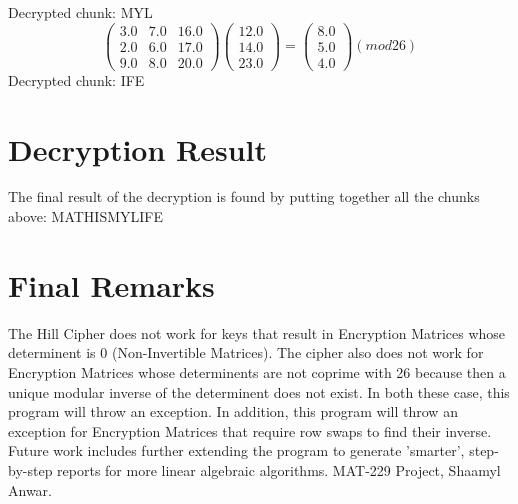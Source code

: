 \documentclass{article}%
\begin{document}
\newline%
%
Decrypted chunk: MYL%
\[%
\begin{pmatrix}%
3.0&7.0&16.0\\%
2.0&6.0&17.0\\%
9.0&8.0&20.0%
\end{pmatrix} \begin{pmatrix}%
12.0\\%
14.0\\%
23.0%
\end{pmatrix} = \begin{pmatrix}%
8.0\\%
5.0\\%
4.0%
\end{pmatrix} (mod26)%
\]%
\newline%
%
Decrypted chunk: IFE

%
\section{Decryption Result}%
\label{sec:DecryptionResult}%
The final result of the decryption is found by putting together all the chunks above: MATHISMYLIFE\newline%

%
\section{Final Remarks}%
\label{sec:FinalRemarks}%
The Hill Cipher does not work for keys that result in Encryption Matrices whose determinent is 0 (Non{-}Invertible Matrices). The cipher also does not work for Encryption Matrices whose determinents are not coprime with 26 because then a unique modular inverse of the determinent does not exist. In both these case, this program will throw an exception. In addition, this program will throw an exception for Encryption Matrices that require row swaps to find their inverse. Future work includes further extending the program to generate 'smarter', step{-}by{-}step reports for more linear algebraic algorithms. \newline%
 \newline%
%
MAT{-}229 Project, Shaamyl Anwar.

%
\end{document}
